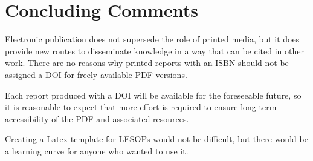 \documentclass{article}
\begin{document}
 \section{Concluding Comments}
 
Electronic publication does not supersede the role of printed media, but it does provide new routes to disseminate knowledge in a way that can be cited in other work. There are no reasons why printed reports with an ISBN should not be assigned a DOI for freely available PDF versions.

Each report produced with a DOI will be available for the foreseeable future, so it is reasonable to expect that more effort is required to ensure long term accessibility of the PDF and associated resources.

Creating a Latex template for LESOPs would not be difficult, but there would be a learning curve for anyone who wanted to use it.




\end{document}
